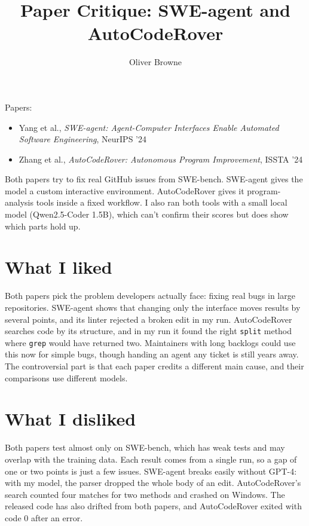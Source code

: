 \documentclass[11pt]{article}
\title{Paper Critique: SWE-agent and AutoCodeRover}
\author{Oliver Browne}
\date{}
\begin{document}
\maketitle
\vspace{-1.5em}

Papers:
\begin{itemize}[nosep]
  \item Yang et al., \emph{SWE-agent: Agent-Computer Interfaces Enable Automated Software Engineering}, NeurIPS '24
  \item Zhang et al., \emph{AutoCodeRover: Autonomous Program Improvement}, ISSTA '24
\end{itemize}

Both papers try to fix real GitHub issues from SWE-bench. SWE-agent gives the model a custom interactive environment. AutoCodeRover gives it program-analysis tools inside a fixed workflow. I also ran both tools with a small local model (Qwen2.5-Coder 1.5B), which can't confirm their scores but does show which parts hold up.

\section{What I liked}

Both papers pick the problem developers actually face: fixing real bugs in large repositories. SWE-agent shows that changing only the interface moves results by several points, and its linter rejected a broken edit in my run. AutoCodeRover searches code by its structure, and in my run it found the right \texttt{split} method where \texttt{grep} would have returned two. Maintainers with long backlogs could use this now for simple bugs, though handing an agent any ticket is still years away. The controversial part is that each paper credits a different main cause, and their comparisons use different models.

\section{What I disliked}

Both papers test almost only on SWE-bench, which has weak tests and may overlap with the training data. Each result comes from a single run, so a gap of one or two points is just a few issues. SWE-agent breaks easily without GPT-4: with my model, the parser dropped the whole body of an edit. AutoCodeRover's search counted four matches for two methods and crashed on Windows. The released code has also drifted from both papers, and AutoCodeRover exited with code 0 after an error.
\end{document}
